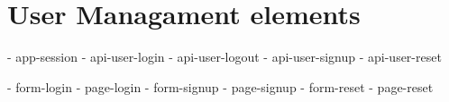 \section{User Managament elements}

- app-session
- api-user-login
- api-user-logout
- api-user-signup
- api-user-reset

- form-login
- page-login
- form-signup
- page-signup
- form-reset
- page-reset

